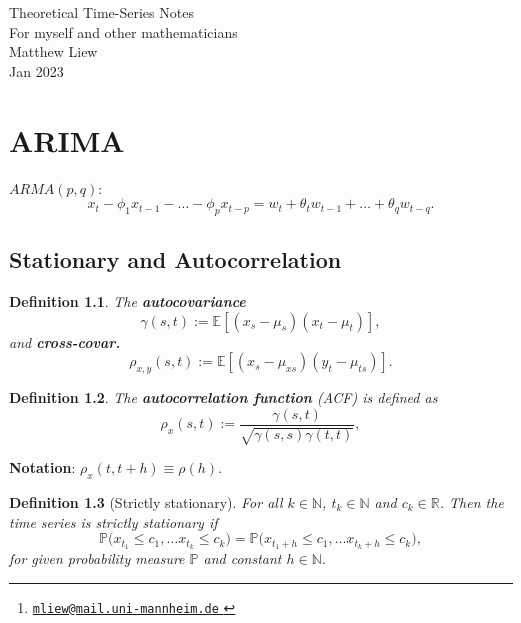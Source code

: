 \documentclass[10pt,titlepage,oneside,openany]{report}
\title{}
\author[1]{Matthew Liew\thanks{\href{mailto:mliew@mail.uni-mannheim.de}{\nolinkurl{mliew@mail.uni-mannheim.de} }}}
\theoremstyle{remark}
\theoremstyle{plain}
\newtheorem{Definition}{Definition}[section]
\newcommand{\R}{\mathbb{R}}
\newcommand{\N}{\mathbb{N}}
\numberwithin{equation}{section}
\renewcommand{\leq}{\leqslant}
\begin{document}
	
	\begin{titlepage}
		\vspace*{1cm}
		\begin{center}
			{\Large Theoretical Time-Series Notes}\\
			\vspace{0.25cm} 
			{For myself and other mathematicians}\\
			\vspace{6cm}
			{Matthew Liew}\\
			\vspace{5cm}
			{Jan 2023}
			
		\end{center}
	\end{titlepage} 
	
	\clearpage


\chapter{ARIMA}\label{intro_thesis}

$ARMA(p,q)$: 
\[
	x_t - \phi_1 x_{t-1} - \dots - \phi_p x_{t-p} = w_t + \theta_t w_{t-1} + \dots + \theta_q w_{t-q}.
\]

\section{Stationary and Autocorrelation}

\begin{Definition}
	The \textbf{autocovariance} $$\gamma (s,t) := \mathds{E} \left[(x_s - \mu_s) (x_t-\mu_t)\right],$$ and \textbf{cross-covar.} $$\rho_{x,y}(s,t):= \mathds{E}\left[(x_s - \mu_{xs})(y_t - \mu_{ts})\right].$$
\end{Definition}

\begin{Definition}
	The \textbf{autocorrelation function} (ACF) is defined as
	\[
		\rho_{x} (s,t)  := \frac{\gamma(s,t)}{\sqrt{\gamma(s,s)\gamma(t,t)}},
	\]
\end{Definition}

\textbf{Notation}: $\rho_{x}(t, t+h)  \equiv \rho(h)$.

\begin{Definition}[Strictly stationary]
	For all $k \in \N$, $t_k \in \N$ and $c_k \in \R$. Then the time series is strictly stationary if
		\[
		\mathds{P} \big(x_{t_1} \leq c_1, \dots x_{t_k} \leq c_k \big) = \mathds{P} \big(x_{t_1+h} \leq c_1, \dots x_{t_k+h} \leq c_k \big),
		\]
		for given probability measure $\mathds{P}$ and constant $h \in \N$.
\end{Definition}
\clearpage
\end{document}
